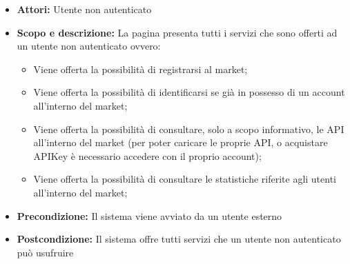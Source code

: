 \documentclass[12pt,a4paper,titlepage]{article}
\begin{document}
	\begin{itemize}
		\item \textbf{Attori:} Utente non autenticato
		\item \textbf{Scopo e descrizione:} La pagina presenta tutti i servizi che sono offerti ad un utente non autenticato ovvero:
		\begin{itemize} 
			\item Viene offerta la possibilità di registrarsi al market; 
			\item Viene offerta la possibilità di identificarsi se già in possesso di un account all'interno del market;
			\item Viene offerta la possibilità di consultare, solo a scopo informativo, le API all'interno del market (per poter caricare le proprie API, o acquistare APIKey è necessario accedere con il proprio account); 
			\item Viene offerta la possibilità di consultare le statistiche riferite agli utenti all'interno del market;
		\end{itemize}
		\item \textbf{Precondizione:} Il sistema viene avviato da un utente esterno
		\item \textbf{Postcondizione:} Il sistema offre tutti servizi che un utente non autenticato può usufruire
	\end{itemize}
\end{document}
